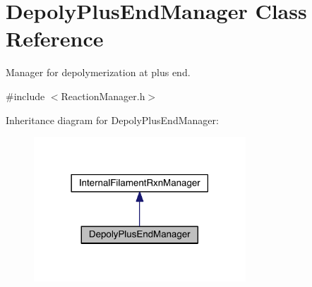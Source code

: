 \hypertarget{classDepolyPlusEndManager}{\section{Depoly\+Plus\+End\+Manager Class Reference}
\label{classDepolyPlusEndManager}
}


Manager for depolymerization at plus end.  




{\ttfamily \#include $<$Reaction\+Manager.\+h$>$}



Inheritance diagram for Depoly\+Plus\+End\+Manager\+:
\nopagebreak
\begin{figure}[H]
\begin{center}
\leavevmode
\includegraphics[width=225pt]{classDepolyPlusEndManager__inherit__graph}
\end{center}
\end{figure}


